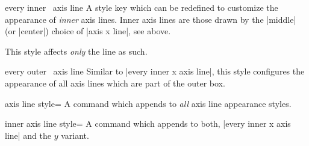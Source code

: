 \begin{pgfplotsxykey}{every inner \x\ axis line}
\label{pgfplots:page:axislines}
    A style key which can be redefined to customize the appearance of
    \emph{inner} axis lines. Inner axis lines are those drawn by the |middle|
    (or |center|) choice of |axis x line|, see above.

    This style affects \emph{only} the line as such.
\begin{codeexample}[]
\end{codeexample}
\end{pgfplotsxykey}

\begin{pgfplotsxykey}{every outer \x\ axis line}
    Similar to |every inner x axis line|, this style configures the appearance
    of all axis lines which are part of the outer box.
\begin{codeexample}[]
\end{codeexample}
\end{pgfplotsxykey}

\begin{pgfplotskey}{axis line style=}
    A command which appends  to \emph{all} axis line
    appearance styles.
\end{pgfplotskey}

\begin{pgfplotskey}{inner axis line style=}
    A command which appends  to both,
    |every inner x axis line| and the $y$ variant.
\end{pgfplotskey}

